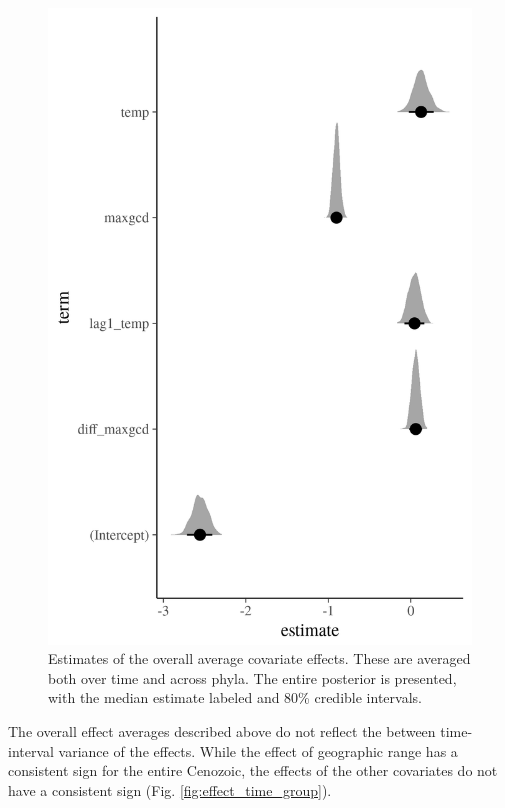 \documentclass[12pt,letterpaper]{article}
\begin{document}
\begin{figure}[ht]
  \centering
  \includegraphics[width=\textwidth,height=0.5\textheight,keepaspectratio=true]{figure/effect_est}
  \caption{Estimates of the overall average covariate effects. These are averaged both over time and across phyla. The entire posterior is presented, with the median estimate labeled and 80\% credible intervals.}
  \label{fig:effect_est}
\end{figure}


The overall effect averages described above do not reflect the between time-interval variance of the effects. While the effect of geographic range has a consistent sign for the entire Cenozoic, the effects of the other covariates do not have a consistent sign (Fig. \ref{fig:effect_time_group}).
\end{document}
